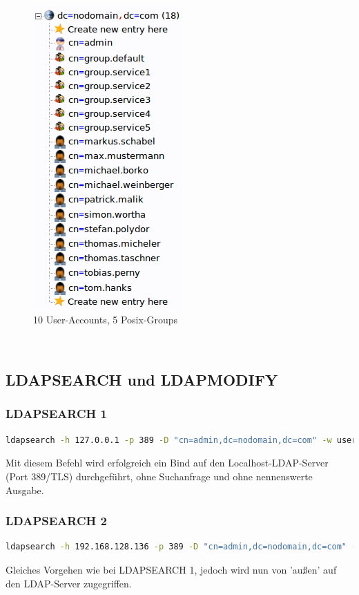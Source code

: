 \documentclass[letterpaper, 12pt]{article}
\let\tempsubsection\subsection
\renewcommand\subsection[1]{\vspace{0cm}\tempsubsection{#1}\vspace{0cm}}
\let\tempsubsubsection\subsubsection
\renewcommand\subsubsection[1]{\vspace{0cm}\tempsubsubsection{#1}\vspace{0cm}}
\begin{document}
\begin{figure}[h]
	\centering \includegraphics[keepaspectratio=true, scale=0.65]{images/10user5groups}
	\caption{10 User-Accounts, 5 Posix-Groups}
\end{figure} \\
\newpage
\subsection{LDAPSEARCH und LDAPMODIFY}
\subsubsection{LDAPSEARCH 1}
\begin{lstlisting}[frame=single, language=bash, caption=1.Befehl]
ldapsearch -h 127.0.0.1 -p 389 -D "cn=admin,dc=nodomain,dc=com" -w user
\end{lstlisting} 
Mit diesem Befehl wird erfolgreich ein Bind auf den Localhost-LDAP-Server (Port 389/TLS) durchgeführt, ohne Suchanfrage und ohne nennenswerte Ausgabe.
\subsubsection{LDAPSEARCH 2}
\begin{lstlisting}[frame=single, language=bash, caption=2.Befehl]
ldapsearch -h 192.168.128.136 -p 389 -D "cn=admin,dc=nodomain,dc=com" -w user
\end{lstlisting} 
Gleiches Vorgehen wie bei LDAPSEARCH 1, jedoch wird nun von 'außen' auf den LDAP-Server zugegriffen.
\end{document}
